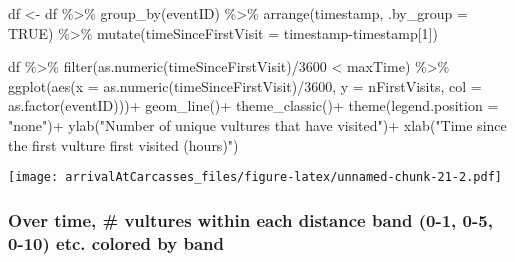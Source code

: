 \documentclass[
]{article}
\newenvironment{Shaded}{\begin{snugshade}}{\end{snugshade}}
\newcommand{\AttributeTok}[1]{\textcolor[rgb]{0.77,0.63,0.00}{#1}}
\newcommand{\ConstantTok}[1]{\textcolor[rgb]{0.00,0.00,0.00}{#1}}
\newcommand{\DecValTok}[1]{\textcolor[rgb]{0.00,0.00,0.81}{#1}}
\newcommand{\FunctionTok}[1]{\textcolor[rgb]{0.00,0.00,0.00}{#1}}
\newcommand{\NormalTok}[1]{#1}
\newcommand{\OtherTok}[1]{\textcolor[rgb]{0.56,0.35,0.01}{#1}}
\newcommand{\SpecialCharTok}[1]{\textcolor[rgb]{0.00,0.00,0.00}{#1}}
\newcommand{\StringTok}[1]{\textcolor[rgb]{0.31,0.60,0.02}{#1}}
\begin{document}
\begin{Shaded}
\begin{Highlighting}[]
\NormalTok{df }\OtherTok{\textless{}{-}}\NormalTok{ df }\SpecialCharTok{\%\textgreater{}\%}
  \FunctionTok{group\_by}\NormalTok{(eventID) }\SpecialCharTok{\%\textgreater{}\%}
  \FunctionTok{arrange}\NormalTok{(timestamp, }\AttributeTok{.by\_group =} \ConstantTok{TRUE}\NormalTok{) }\SpecialCharTok{\%\textgreater{}\%}
  \FunctionTok{mutate}\NormalTok{(}\AttributeTok{timeSinceFirstVisit =}\NormalTok{ timestamp}\SpecialCharTok{{-}}\NormalTok{timestamp[}\DecValTok{1}\NormalTok{])}

\NormalTok{df }\SpecialCharTok{\%\textgreater{}\%}
  \FunctionTok{filter}\NormalTok{(}\FunctionTok{as.numeric}\NormalTok{(timeSinceFirstVisit)}\SpecialCharTok{/}\DecValTok{3600} \SpecialCharTok{\textless{}}\NormalTok{ maxTime) }\SpecialCharTok{\%\textgreater{}\%}
  \FunctionTok{ggplot}\NormalTok{(}\FunctionTok{aes}\NormalTok{(}\AttributeTok{x =} \FunctionTok{as.numeric}\NormalTok{(timeSinceFirstVisit)}\SpecialCharTok{/}\DecValTok{3600}\NormalTok{, }\AttributeTok{y =}\NormalTok{ nFirstVisits, }\AttributeTok{col =} \FunctionTok{as.factor}\NormalTok{(eventID)))}\SpecialCharTok{+}       \FunctionTok{geom\_line}\NormalTok{()}\SpecialCharTok{+}
  \FunctionTok{theme\_classic}\NormalTok{()}\SpecialCharTok{+}
  \FunctionTok{theme}\NormalTok{(}\AttributeTok{legend.position =} \StringTok{"none"}\NormalTok{)}\SpecialCharTok{+}
  \FunctionTok{ylab}\NormalTok{(}\StringTok{"Number of unique vultures that have visited"}\NormalTok{)}\SpecialCharTok{+}
  \FunctionTok{xlab}\NormalTok{(}\StringTok{"Time since the first vulture first visited (hours)"}\NormalTok{)}
\end{Highlighting}
\end{Shaded}

\texttt{[image: arrivalAtCarcasses\_files/figure-latex/unnamed-chunk-21-2.pdf]}

\hypertarget{over-time-vultures-within-each-distance-band-0-1-0-5-0-10-etc.-colored-by-band}{%
\subsubsection{Over time, \# vultures within each distance band (0-1,
0-5, 0-10) etc. colored by
band}\label{over-time-vultures-within-each-distance-band-0-1-0-5-0-10-etc.-colored-by-band}}
\end{document}
